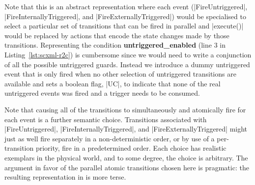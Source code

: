 Note that this is an abstract representation where each event (|FireUntriggered|, |FireInternallyTriggered|, and |FireExternallyTriggered|) would be specialised to select a particular set of transitions that can be fired in parallel and |execute()| would be replaced by actions that encode the state changes made by those transitions.
Representing the condition \textbf{untriggered\_enabled} (line 3 in Listing~\ref{lst:scxml-r2c}) is cumbersome since we would need to write a conjunction of all the possible untriggered guards. Instead we introduce a dummy untriggered event that is only fired when no other selection of untriggered transitions are available and sets a boolean flag, |UC|, to indicate that none of the real untriggered events was fired and a trigger needs to be consumed.
 
Note that causing all of the
transitions to simultaneously and atomically fire for each event is a
further semantic choice.  Transitions associated with |FireUntriggered|,
|FireInternallyTriggered|, and |FireExternallyTriggered| might
just as well fire separately in a non-deterministic order, or by use
of a per-transition priority, fire in a predetermined order.  Each
choice has realistic exemplars in the physical world, and to some
degree, the choice is arbitrary.  The argument in favor of the
parallel atomic transitions chosen here is pragmatic: the resulting
representation in \EventB is more terse.

